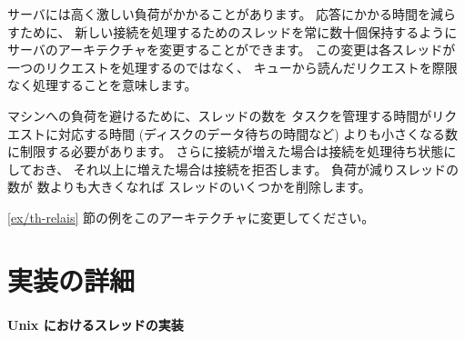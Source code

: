 \begin{exercise}[noanswer]
\http サーバには高く激しい負荷がかかることがあります。
応答にかかる時間を減らすために、
新しい接続を処理するためのスレッドを常に数十個保持するように \http
サーバのアーキテクチャを変更することができます。
この変更は各スレッドが一つのリクエストを処理するのではなく、
キューから読んだリクエストを際限なく処理することを意味します。


マシンへの負荷を避けるために、スレッドの数を
タスクを管理する時間がリクエストに対応する時間 (ディスクのデータ待ちの時間など)
よりも小さくなる数に制限する必要があります。
さらに接続が増えた場合は接続を処理待ち状態にしておき、
それ以上に増えた場合は接続を拒否します。
負荷が減りスレッドの数が  数よりも大きくなれば
スレッドのいくつかを削除します。

\ref{ex/th-relais} 節の例をこのアーキテクチャに変更してください。
\end{exercise}


\section{実装の詳細}

\paragraph {Unix におけるスレッドの実装}

